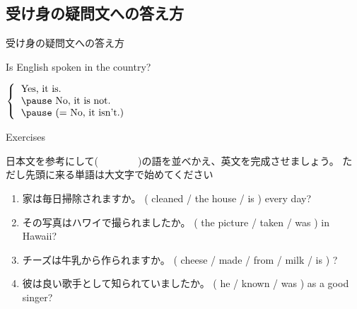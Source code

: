 \documentclass[aspectratio=169,xcolor={dvipsnames,table}]{beamer}
\newcommand{\myaudio}[1]{\href{#1}{\faVolumeUp}}
\begin{document}
\subsection{受け身の疑問文への答え方}
\begin{frame}[plain]{受け身の疑問文への答え方}
 \Large

Is English spoken in the country?

\vspace{20pt}
\pause

\mbox{}\hspace{100pt}$\left\{\begin{tabular}{ll}
         \text{Yes, it is.}&\\\pause
         \text{No, it is not.}&\\\pause
         \text{(}= \text{No, it isn't.)}&
        \end{tabular}\right.$



\end{frame}
\begin{frame}[plain]{Exercises}
 
{\small 日本文を参考にして(~~~~~~~~)の語を並べかえ、英文を完成させましょう。
ただし先頭に来る単語は大文字で始めてください}\hfill{\scriptsize \myaudio{./audio/051_passive_08.mp3}}




\begin{enumerate}
 \item {\small 家は毎日掃除されますか}。
( cleaned / the house / is ) every day?\\
 \item {\small その写真はハワイで撮られましたか。}
( the picture / taken /  was ) in Hawaii?\\
 \item {\small チーズは牛乳から作られますか}。
( cheese / made / from / milk / is ) ?\\
 \item {\small 彼は良い歌手として知られていましたか。}
( he / known /  was ) as a good singer?\\
\end{enumerate}

\end{frame}
\end{document}
